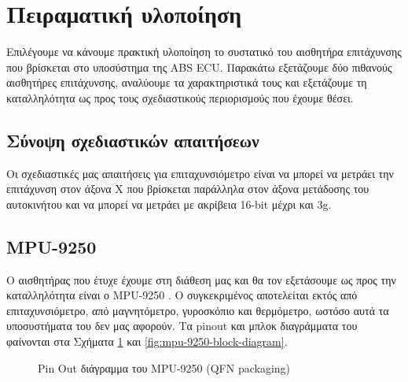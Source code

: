 \documentclass{article}
\begin{document}
\section{Πειραματική υλοποίηση}
Επιλέγουμε να κάνουμε πρακτική υλοποίηση το συστατικό του αισθητήρα επιτάχυνσης που βρίσκεται στο υποσύστημα της ABS ECU. Παρακάτω εξετάζουμε δύο πιθανούς αισθητήρες επιτάχυνσης, αναλύουμε τα χαρακτηριστικά τους και εξετάζουμε τη καταλληλότητα ως προς τους σχεδιαστικούς περιορισμούς που έχουμε θέσει.

\subsection{Σύνοψη σχεδιαστικών απαιτήσεων}
Οι σχεδιαστικές μας απαιτήσεις για επιταχυνσιόμετρο είναι να μπορεί να μετράει την επιτάχυνση στον άξονα Χ που βρίσκεται παράλληλα στον άξονα μετάδοσης του αυτοκινήτου και να μπορεί να μετράει με ακρίβεια 16-bit μέχρι και 3g.

\subsection{MPU-9250}
Ο αισθητήρας που έτυχε έχουμε στη διάθεση μας και θα τον εξετάσουμε ως προς την καταλληλότητα είναι ο MPU-9250 \cite{evensense:20}. Ο συγκεκριμένος αποτελείται εκτός από επιταχυνσιόμετρο, από μαγνητόμετρο, γυροσκόπιο και θερμόμετρο, ωστόσο αυτά τα υποσυστήματα του δεν μας αφορούν. Τα pinout και μπλοκ διαγράμματα του φαίνονται στα Σχήματα \ref{fig:mpu-9250-qfn} και \ref{fig:mpu-9250-block-diagram}.

\begin{figure}[H]
  \caption{Pin Out διάγραμμα του MPU-9250 (QFN packaging) \cite{evensense:20}}
  \label{fig:mpu-9250-qfn}
\end{figure}
\end{document}
